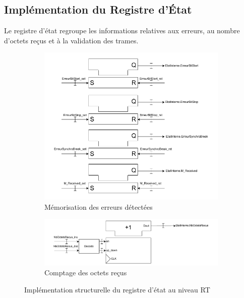 \subsection{Implémentation du Registre d’État}

Le registre d’état regroupe les informations relatives aux erreurs, au nombre d’octets reçus et à la validation des trames.

\begin{figure}[htbp]
    \centering
    \begin{subfigure}[b]{0.49\textwidth}
        \centering
        \includegraphics[width=\textwidth]{images/inter/Implementation_ETAT_Erreur.pdf}
        \caption{Mémorisation des erreurs détectées}
    \end{subfigure}
    \hfill
    \begin{subfigure}[b]{0.49\textwidth}
        \centering
        \includegraphics[width=\textwidth]{images/inter/Implementation_ETAT_NbOctets.pdf}
        \caption{Comptage des octets reçus}
    \end{subfigure}
    \caption{Implémentation structurelle du registre d’état au niveau RT}
    \label{fig:etat_impl}
\end{figure}
